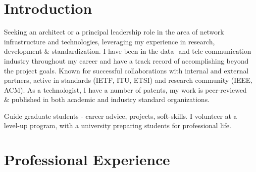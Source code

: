 \documentclass[11pt,a4paper,sans]{moderncv} %
\begin{document}
\makecvtitle %
\vspace{-13mm}
\section{Introduction}
 {Seeking an architect or a principal leadership role in the area of network infrastructure and technologies, leveraging my experience in research, development \& standardization.}
 {I have been in the data- and tele-communication industry  throughout my career and have a track record of accomplishing beyond the project goals. Known for successful collaborations with internal and external partners, active in standards (IETF, ITU, ETSI) and research community (IEEE, ACM). \newline As a technologist, I have a number of patents, my work is peer-reviewed \& published in both academic and industry standard organizations.}

  { Guide graduate students - career advice, projects, soft-skills. I  volunteer at a level-up program, with a university  preparing students for professional life.}





\section{Professional Experience}
\end{document}
